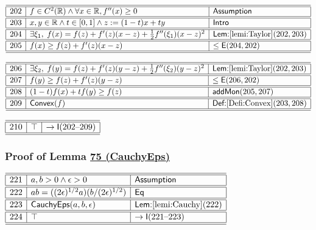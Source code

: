 \documentclass[11pt,reqno]{amsart}
\begin{document}
\noindent$%
\begin{array}{|r|l|l|}
\hline\hline
202 & f\in C^{2}(\mathbb{R})\wedge\forall x\in\mathbb{R},f^{\prime \prime }(x)\ge0 & \textsf{Assumption} \\ \hline\hline
203 & x,y\in\mathbb{R}\wedge t\in[0,1]\wedge z:=(1-t)x+ty & \textsf{Intro} \\ \hline\hline
204 & \exists\xi_{1},\;f(x)=f(z)+f^{\prime }(z)(x-z)+\tfrac{1}{2}f^{\prime \prime }(\xi_{1})(x-z)^{2} & \textsf{Lem:}\ref{lemi:Taylor}(202,203) \\ \hline\hline
205 & f(x)\ge f(z)+f^{\prime }(z)(x-z) & \le\mathsf{E}(204,202) \\ \hline\hline
\end{array}%
$

\medskip

\noindent$%
\begin{array}{|r|l|l|}
\hline\hline
206 & \exists\xi_{2},\;f(y)=f(z)+f^{\prime }(z)(y-z)+\tfrac{1}{2}f^{\prime \prime }(\xi_{2})(y-z)^{2} & \textsf{Lem:}\ref{lemi:Taylor}(202,203) \\ \hline\hline
207 & f(y)\ge f(z)+f^{\prime }(z)(y-z) & \le\mathsf{E}(206,202) \\ \hline\hline
208 & (1-t)f(x)+tf(y)\ge f(z) & \mathsf{addMon}(205,207) \\ \hline\hline
209 & \mathsf{Convex}(f) & \textsf{Def:}\ref{Defi:Convex}(203,208) \\ \hline\hline
\end{array}%
$

\medskip

\noindent$%
\begin{array}{|r|l|l|}
\hline\hline
210 & \top & \to\mathsf{I}(202\text{--}209) \\ \hline\hline
\end{array}%
$

\medskip

\subsubsection*{Proof of Lemma \hyperlink{lem:CauchyEps}{75 (\textsf{CauchyEps})}}

\noindent$%
\begin{array}{|r|l|l|}
\hline\hline
221 & a,b>0\wedge\epsilon>0 & \textsf{Assumption} \\ \hline\hline
222 & ab=((2\epsilon)^{1/2}a)(b/(2\epsilon)^{1/2}) & \mathsf{Eq} \\ \hline\hline
223 & \mathsf{CauchyEps}(a,b,\epsilon) & \textsf{Lem:}\ref{lemi:Cauchy}(222) \\ \hline\hline
224 & \top & \to\mathsf{I}(221\text{--}223) \\ \hline\hline
\end{array}%
$
\end{document}
